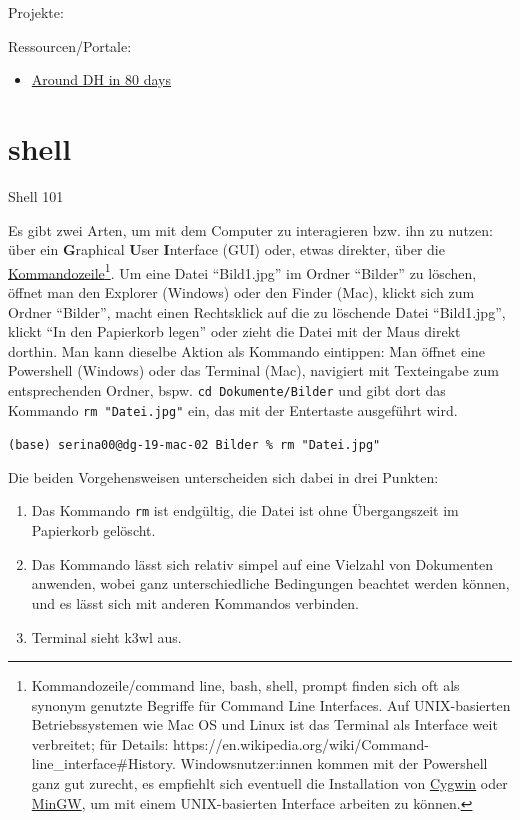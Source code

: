 \documentclass[
  letterpaper,
]{book}
\providecommand{\tightlist}{%
  \setlength{\itemsep}{0pt}\setlength{\parskip}{0pt}}\usepackage{longtable,booktabs,array}
\begin{document}
Projekte:

Ressourcen/Portale:

\begin{itemize}
\tightlist
\item
  \href{https://arounddh.org/index.html}{Around DH in 80 days}
\end{itemize}


\hypertarget{shell}{%
\chapter{shell}\label{shell}}

Shell 101

Es gibt zwei Arten, um mit dem Computer zu interagieren bzw. ihn zu
nutzen: über ein \textbf{G}raphical \textbf{U}ser \textbf{I}nterface
(GUI) oder, etwas direkter, über die
\href{https://de.wikipedia.org/wiki/Kommandozeile}{Kommandozeile}\footnote{Kommandozeile/command
  line, bash, shell, prompt finden sich oft als synonym genutzte
  Begriffe für Command Line Interfaces. Auf UNIX-basierten
  Betriebssystemen wie Mac OS und Linux ist das Terminal als Interface
  weit verbreitet; für Details:
  https://en.wikipedia.org/wiki/Command-line\_interface\#History.
  Windowsnutzer:innen kommen mit der Powershell ganz gut zurecht, es
  empfiehlt sich eventuell die Installation von
  \href{https://en.wikipedia.org/wiki/Cygwin}{Cygwin} oder
  \href{https://en.wikipedia.org/wiki/MinGW}{MinGW}, um mit einem
  UNIX-basierten Interface arbeiten zu können.}. Um eine Datei
``Bild1.jpg'' im Ordner ``Bilder'' zu löschen, öffnet man den Explorer
(Windows) oder den Finder (Mac), klickt sich zum Ordner ``Bilder'',
macht einen Rechtsklick auf die zu löschende Datei ``Bild1.jpg'', klickt
``In den Papierkorb legen'' oder zieht die Datei mit der Maus direkt
dorthin. Man kann dieselbe Aktion als Kommando eintippen: Man öffnet
eine Powershell (Windows) oder das Terminal (Mac), navigiert mit
Texteingabe zum entsprechenden Ordner, bspw.
\texttt{cd\ Dokumente/Bilder} und gibt dort das Kommando
\texttt{rm\ "Datei.jpg"} ein, das mit der Entertaste ausgeführt wird.

\texttt{(base)\ serina00@dg-19-mac-02\ Bilder\ \%\ rm\ "Datei.jpg"}

Die beiden Vorgehensweisen unterscheiden sich dabei in drei Punkten:

\begin{enumerate}
\def\labelenumi{\arabic{enumi}.}
\tightlist
\item
  Das Kommando \texttt{rm} ist endgültig, die Datei ist ohne
  Übergangszeit im Papierkorb gelöscht.
\item
  Das Kommando lässt sich relativ simpel auf eine Vielzahl von
  Dokumenten anwenden, wobei ganz unterschiedliche Bedingungen beachtet
  werden können, und es lässt sich mit anderen Kommandos verbinden.
\item
  Terminal sieht k3wl aus.
\end{enumerate}
\end{document}
